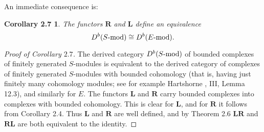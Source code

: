 \documentclass{tran-l}
\newcommand{\iso}{\cong}
\newcommand{\LL}{\mathbf{L}}
\newcommand{\RR}{\mathbf{R}}
\theoremstyle{plain}
\newtheorem*{theorem9}{Corollary 2.7}
\theoremstyle{remark}
\theoremstyle{definition}
\begin{document}
An immediate consequence is:
\begin{theorem9}
The functors $\RR $ and $\LL $
define an equivalence 
\[D^{b}(S\textup{-mod})\iso D^{b}(E\textup{-mod}).\]
\end{theorem9}
\begin{proof}[Proof of Corollary $2.7$] The derived category $D^{b}(S\hbox {-mod})$ of bounded complexes
of finitely generated $S$-modules is equivalent to the derived
category of complexes of finitely generated $S$-modules with
bounded cohomology (that is, having just finitely many
cohomology modules; see for example Hartshorne \cite{Har}, III, Lemma 12.3),
and similarly for $E$. The functors $\LL $ and $\RR $ carry
bounded complexes into complexes with bounded cohomology. This is clear for 
$\LL $, and for $\RR $ it
follows from Corollary 2.4. Thus $\LL $ and $\RR $ are well defined, and by
Theorem 2.6
$\LL \RR$ and $\RR \LL $ are both equivalent to the identity.
\end{proof}
\end{document}

